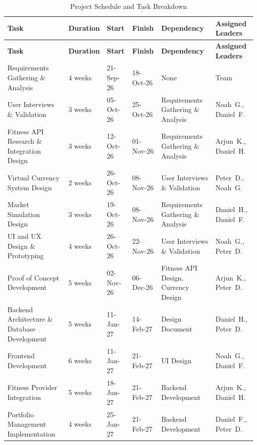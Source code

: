 \documentclass[12pt, titlepage]{article}
\begin{document}
{\small
\setlength{\tabcolsep}{4pt}
\begin{longtable}{|>{\raggedright\arraybackslash}p{3.4cm}|p{1.8cm}|p{1.8cm}|p{1.8cm}%
  |>{\raggedright\arraybackslash}p{3.3cm}|>{\raggedright\arraybackslash}p{2.6cm}|}
\caption{Project Schedule and Task Breakdown} \label{tab:mg_timeline} \\
\hline
\textbf{Task} & \textbf{Duration} & \textbf{Start} & \textbf{Finish} & \textbf{Dependency} & \textbf{Assigned Leaders} \\ \hline
\endfirsthead
\hline
\textbf{Task} & \textbf{Duration} & \textbf{Start} & \textbf{Finish} & \textbf{Dependency} & \textbf{Assigned Leaders} \\ \hline
\endhead
Requirements Gathering \& Analysis & 4 weeks & 21-Sep-26 & 18-Oct-26 & None & Team \\ \hline
User Interviews \& Validation & 3 weeks & 05-Oct-26 & 25-Oct-26 & Requirements Gathering \& Analysis & Noah~G., Daniel~F. \\ \hline
Fitness API Research \& Integration Design & 3 weeks & 12-Oct-26 & 01-Nov-26 & Requirements Gathering \& Analysis & Arjun~K., Daniel~H. \\ \hline
Virtual Currency System Design & 2 weeks & 26-Oct-26 & 08-Nov-26 & User Interviews \& Validation & Peter~D., Noah~G. \\ \hline
Market Simulation Design & 3 weeks & 19-Oct-26 & 08-Nov-26 & Requirements Gathering \& Analysis & Daniel~H., Daniel~F. \\ \hline
UI and UX Design \& Prototyping & 4 weeks & 26-Oct-26 & 22-Nov-26 & User Interviews \& Validation & Noah~G., Peter~D. \\ \hline
Proof of Concept Development & 5 weeks & 02-Nov-26 & 06-Dec-26 & Fitness API Design, Currency Design & Arjun~K., Peter~D. \\ \hline
Backend Architecture \& Database Development & 5 weeks & 11-Jan-27 & 14-Feb-27 & Design Document & Daniel~H., Peter~D. \\ \hline
Frontend Development & 6 weeks & 11-Jan-27 & 21-Feb-27 & UI Design & Noah~G., Daniel~F. \\ \hline
Fitness Provider Integration & 5 weeks & 18-Jan-27 & 21-Feb-27 & Backend Development & Arjun~K., Daniel~H. \\ \hline
Portfolio Management Implementation & 4 weeks & 25-Jan-27 & 21-Feb-27 & Backend Development & Daniel~F., Peter~D. \\ \hline

\end{longtable}}
\end{document}
